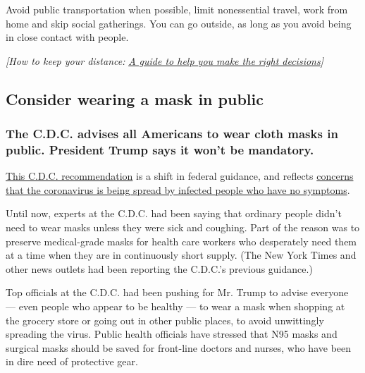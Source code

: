 Avoid public transportation when possible, limit nonessential travel,
work from home and skip social gatherings. You can go outside, as long
as you avoid being in close contact with people.

\emph{{[}How to keep your distance:}
\href{https://www.nytimes.com/2020/03/19/well/live/coronavirus-quarantine-social-distancing.html}{\emph{A
guide to help you make the right decisions}}\emph{{]}}

\hypertarget{consider-wearing-a-mask-in-public}{%
\subsection{Consider wearing a mask in
public}\label{consider-wearing-a-mask-in-public}}

\hypertarget{the-cdc-advises-all-americans-to-wear-cloth-masks-in-public-president-trump-says-it-wont-be-mandatory}{%
\subsubsection{\texorpdfstring{\textbf{The C.D.C. advises all Americans
to wear cloth masks in public. President Trump says it won't be
mandatory.}}{The C.D.C. advises all Americans to wear cloth masks in public. President Trump says it won't be mandatory.}}\label{the-cdc-advises-all-americans-to-wear-cloth-masks-in-public-president-trump-says-it-wont-be-mandatory}}

\href{https://www.nytimes.com/2020/04/03/world/coronavirus-news-updates.html}{This
C.D.C. recommendation} is a shift in federal guidance, and reflects
\href{https://www.nytimes.com/2020/03/31/health/coronavirus-asymptomatic-transmission.html}{concerns
that the coronavirus is being spread by infected people who have no
symptoms}.

Until now, experts at the C.D.C. had been saying that ordinary people
didn't need to wear masks unless they were sick and coughing. Part of
the reason was to preserve medical-grade masks for health care workers
who desperately need them at a time when they are in continuously short
supply. (The New York Times and other news outlets had been reporting
the C.D.C.'s previous guidance.)

Top officials at the C.D.C. had been pushing for Mr. Trump to advise
everyone --- even people who appear to be healthy --- to wear a mask
when shopping at the grocery store or going out in other public places,
to avoid unwittingly spreading the virus. Public health officials have
stressed that N95 masks and surgical masks should be saved for
front-line doctors and nurses, who have been in dire need of protective
gear.

